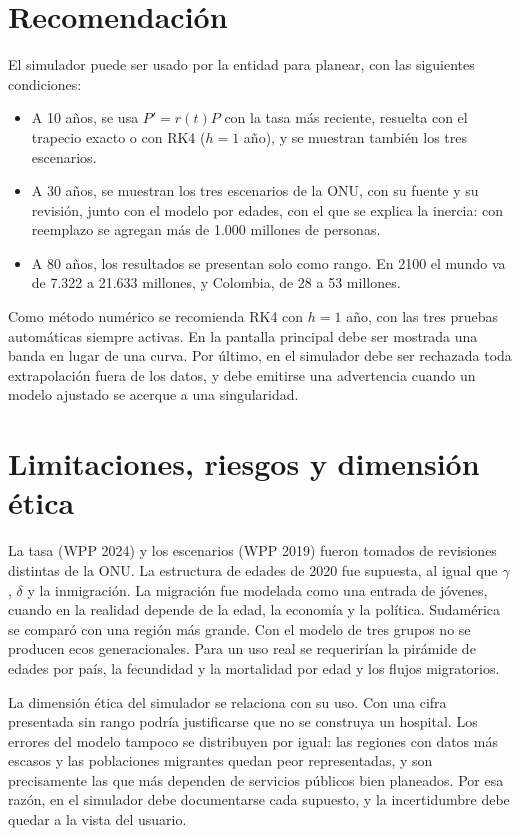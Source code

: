 \documentclass[10pt,twocolumn,letterpaper]{article}
\begin{document}
\section{Recomendación}
El simulador puede ser usado por la entidad para planear, con las siguientes condiciones:
\begin{itemize}
\item A 10 años, se usa $P'=r(t)P$ con la tasa más reciente, resuelta con el trapecio exacto o con RK4 ($h=1$ año), y se muestran también los tres escenarios.
\item A 30 años, se muestran los tres escenarios de la ONU, con su fuente y su revisión, junto con el modelo por edades, con el que se explica la inercia: con reemplazo se agregan más de 1.000 millones de personas.
\item A 80 años, los resultados se presentan solo como rango. En 2100 el mundo va de 7.322 a 21.633 millones, y Colombia, de 28 a 53 millones.
\end{itemize}
Como método numérico se recomienda RK4 con $h=1$ año, con las tres pruebas automáticas siempre activas. En la pantalla principal debe ser mostrada una banda en lugar de una curva. Por último, en el simulador debe ser rechazada toda extrapolación fuera de los datos, y debe emitirse una advertencia cuando un modelo ajustado se acerque a una singularidad.

\section{Limitaciones, riesgos y dimensión ética}
La tasa (WPP 2024) y los escenarios (WPP 2019) fueron tomados de revisiones distintas de la ONU. La estructura de edades de 2020 fue supuesta, al igual que $\gamma$, $\delta$ y la inmigración. La migración fue modelada como una entrada de jóvenes, cuando en la realidad depende de la edad, la economía y la política. Sudamérica se comparó con una región más grande. Con el modelo de tres grupos no se producen ecos generacionales. Para un uso real se requerirían la pirámide de edades por país, la fecundidad y la mortalidad por edad y los flujos migratorios.

La dimensión ética del simulador se relaciona con su uso. Con una cifra presentada sin rango podría justificarse que no se construya un hospital. Los errores del modelo tampoco se distribuyen por igual: las regiones con datos más escasos y las poblaciones migrantes quedan peor representadas, y son precisamente las que más dependen de servicios públicos bien planeados. Por esa razón, en el simulador debe documentarse cada supuesto, y la incertidumbre debe quedar a la vista del usuario.
\end{document}
